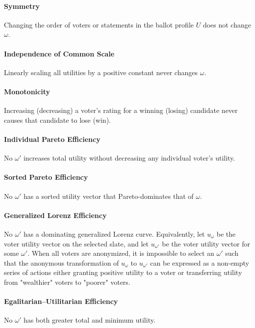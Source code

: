 \documentclass[11pt]{article}
\begin{document}
\paragraph{Symmetry}
Changing the order of voters or statements in the ballot profile $U$ does not change $\omega$.

\paragraph{Independence of Common Scale}
Linearly scaling all utilities by a positive constant never changes $\omega$.

\paragraph{Monotonicity}
Increasing (decreasing) a voter’s rating for a winning (losing) candidate never causes that candidate to lose (win).

\paragraph{Individual Pareto Efficiency}
No $\omega'$ increases total utility without decreasing any individual voter's utility.

\paragraph{Sorted Pareto Efficiency \citep{sorted-pareto}}
No $\omega'$ has a sorted utility vector that Pareto-dominates that of $\omega$.

\paragraph{Generalized Lorenz Efficiency \citep{shorrocks-1983}}
No $\omega'$ has a dominating generalized Lorenz curve. Equivalently, let $u_{\omega}$ be the voter utility vector on the selected slate, and let $u_{\omega'}$ be the voter utility vector for some $\omega'$. When all voters are anonymized, it is impossible to select an $\omega'$ such that the anonymous transformation of $u_{\omega}$ to $u_{\omega'}$ can be expressed as a non-empty series of actions either granting positive utility to a voter or transferring utility from "wealthier" voters to "poorer" voters.

\paragraph{Egalitarian--Utilitarian Efficiency}
No $\omega'$ has both greater total and minimum utility.
\end{document}
